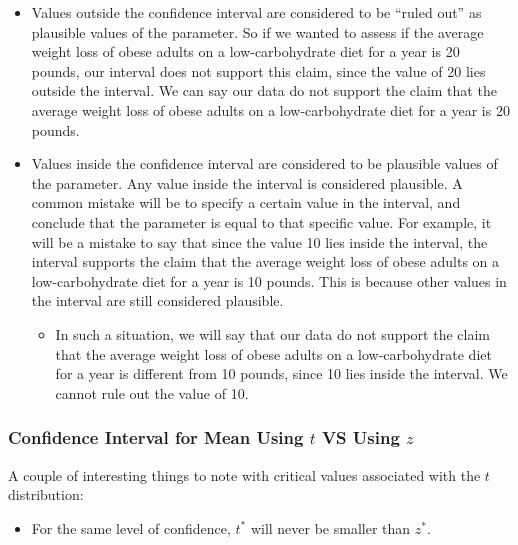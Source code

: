 \documentclass[
]{book}
\providecommand{\tightlist}{%
  \setlength{\itemsep}{0pt}\setlength{\parskip}{0pt}}
\theoremstyle{definition}
\theoremstyle{definition}
\theoremstyle{definition}
\theoremstyle{definition}
\theoremstyle{remark}
\begin{document}
\begin{itemize}
\item
  Values outside the confidence interval are considered to be ``ruled out'' as plausible values of the parameter. So if we wanted to assess if the average weight loss of obese adults on a low-carbohydrate diet for a year is 20 pounds, our interval does not support this claim, since the value of 20 lies outside the interval. We can say our data do not support the claim that the average weight loss of obese adults on a low-carbohydrate diet for a year is 20 pounds.
\item
  Values inside the confidence interval are considered to be plausible values of the parameter. Any value inside the interval is considered plausible. A common mistake will be to specify a certain value in the interval, and conclude that the parameter is equal to that specific value. For example, it will be a mistake to say that since the value 10 lies inside the interval, the interval supports the claim that the average weight loss of obese adults on a low-carbohydrate diet for a year is 10 pounds. This is because other values in the interval are still considered plausible.

  \begin{itemize}
  \tightlist
  \item
    In such a situation, we will say that our data do not support the claim that the average weight loss of obese adults on a low-carbohydrate diet for a year is different from 10 pounds, since 10 lies inside the interval. We cannot rule out the value of 10.
  \end{itemize}
\end{itemize}

\hypertarget{confidence-interval-for-mean-using-t-vs-using-z}{%
\subsubsection{\texorpdfstring{Confidence Interval for Mean Using \(t\) VS Using \(z\)}{Confidence Interval for Mean Using t VS Using z}}\label{confidence-interval-for-mean-using-t-vs-using-z}}

A couple of interesting things to note with critical values associated with the \(t\) distribution:

\begin{itemize}
\tightlist
\item
  For the same level of confidence, \(t^*\) will never be smaller than \(z^*\).
\end{itemize}
\end{document}
